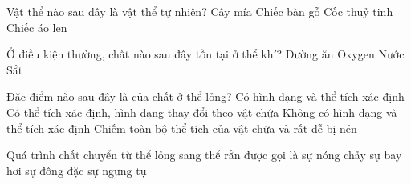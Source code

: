 \documentclass[FileMain.tex]{subfiles}
\begin{document}
\begin{ex}%
Vật thể nào sau đây là vật thể tự nhiên?
\choice
{\True Cây mía}
{Chiếc bàn gỗ}
{Cốc thuỷ tinh}
{Chiếc áo len}
\end{ex}

\begin{ex}%
Ở điều kiện thường, chất nào sau đây tồn tại ở thể khí?
\choice
{Đường ăn}
{\True Oxygen}
{Nước}
{Sắt}
\end{ex}

\begin{ex}%
Đặc điểm nào sau đây là của chất ở thể lỏng?
\choice
{Có hình dạng và thể tích xác định}
{\True Có thể tích xác định, hình dạng thay đổi theo vật chứa}
{Không có hình dạng và thể tích xác định}
{Chiếm toàn bộ thể tích của vật chứa và rất dễ bị nén}
\end{ex}

\begin{ex}%
Quá trình chất chuyển từ thể lỏng sang thể rắn được gọi là
\choice
{sự nóng chảy}
{sự bay hơi}
{\True sự đông đặc}
{sự ngưng tụ}
\end{ex}
\end{document}
